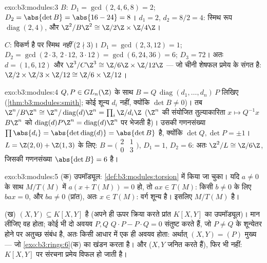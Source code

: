\begin{solution}{exo:b3:modules:3}
$B$: $D_1 = \gcd(2,4,6,8) = 2$; $D_2 = \abs{\det B} = \abs{16 -
24} = 8$।  $d_1 = 2$, $d_2 = 8/2 = 4$: स्मिथ रूप $\operatorname{diag}(2, 4)$, और
$\Z^2/B\Z^2 \cong \Z/2\Z
\times \Z/4\Z$।

$C$: विकर्ण है पर स्मिथ \emph{नहीं} ($2 \nmid 3$)। $D_1 =
\gcd(2,3,12) = 1$; $D_2 = \gcd(2\cdot3,\, 2\cdot12,\, 3\cdot12) =
\gcd(6, 24, 36) = 6$; $D_3 = 72$। अतः
$d = (1, 6, 12)$ और $\Z^3/C\Z^3 \cong \Z/6\Z\times\Z/12\Z$ --- जो चीनी शेषफल प्रमेय के संगत है: $\Z/2\times\Z/3\times\Z/12 \cong \Z/6\times\Z/12$।
\end{solution}

\begin{solution}{exo:b3:modules:4}
$Q, P
\in GL_n(\Z)$ के साथ $B = Q\,\operatorname{diag}(d_1, \dots, d_n)\,P$ लिखिए (\cref{thm:b3:modules:smith}; कोई शून्य $d_i$ नहीं, क्योंकि $\det B \neq 0$)।
तब $\Z^n/B\Z^n \cong \Z^n/
\operatorname{diag}(d)\Z^n = \prod_i \Z/d_i\Z$ ($\Z^n$ की संयोजित तुल्याकारिता $x \mapsto Q^{-1}x$ $B\Z^n$ को $\operatorname{diag}(d)P\Z^n = \operatorname{diag}(d)\Z^n$ पर भेजती
है)। उसकी गणनसंख्या $\prod \abs{d_i} = \abs{\det
\operatorname{diag}(d)} = \abs{\det B}$ है, क्योंकि $\det Q, \det P = \pm
1$। $L = \Z(2,0) + \Z(1,3)$ के लिए: $B = \bigl(\begin{smallmatrix}2
& 1\\ 0 & 3\end{smallmatrix}\bigr)$, $D_1 = 1$,
$D_2 = 6$: अतः $\Z^2/L
\cong \Z/6\Z$, जिसकी गणनसंख्या $\abs{\det B} = 6$ है।
\end{solution}

\begin{solution}{exo:b3:modules:5}
(क) उपमॉड्यूल: \cref{def:b3:modules:torsion} में किया जा चुका। यदि $a \neq 0$ के साथ $M/T(M)$ में
$a(x +
T(M)) = 0$ हो, तो $ax \in T(M)$: किसी $b \neq 0$ के लिए $bax
= 0$, और $ba \neq 0$ (प्रांत), अतः
$x \in
T(M)$: वर्ग शून्य है। इसलिए $M/T(M)$  है।

(ख) $(X, Y) \subseteq K[X,Y]$  है (अपने ही ऊपर क्रिया करते प्रांत $K[X,Y]$ का
उपमॉड्यूल)। मान लीजिए वह  होता; कोई भी दो अवयव $P, Q$ $Q\cdot P - P \cdot Q = 0$ संतुष्ट
करते हैं, जो $P \ne Q$ के शून्येतर होने पर अतुच्छ संबंध है, अतः किसी
आधार में एक ही अवयव होता: अर्थात् $(X, Y) = (P)$ मुख्य --- जो \cref{exo:b3:rings:6}(क) का खंडन
करता है।  और  ($X, Y$ जनित करते हैं), फिर भी
 नहीं:  $K[X,Y]$ पर संरचना प्रमेय विफल हो जाती है।
\end{solution}


